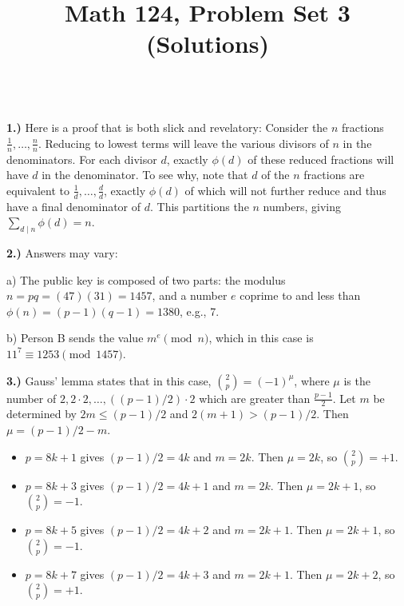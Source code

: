 \documentclass[10pt]{amsart}
\title{Math 124, Problem Set 3 (Solutions)}
\begin{document}
\maketitle

\\

{\bf 1.)} Here is a proof that is both slick and revelatory: Consider the $n$ fractions $\frac{1}{n}, \dotsc, \frac{n}{n}$. Reducing to lowest terms will leave the various divisors of $n$ in the denominators. For each divisor $d$, exactly $\phi(d)$ of these reduced fractions will have $d$ in the denominator. To see why, note that $d$ of the $n$ fractions are equivalent to $\frac{1}{d}, \dotsc, \frac{d}{d}$, exactly $\phi(d)$ of which will not further reduce and thus have a final denominator of $d$. This partitions the $n$ numbers, giving $\sum_{d \mid n} \phi(d) = n$.

\medskip

{\bf 2.)} Answers may vary:

\smallskip

a) The public key is composed of two parts: the modulus $n = pq = (47)(31) = 1457$, and a number $e$ coprime to and less than $\phi(n) = (p-1)(q-1) = 1380$, e.g., 7.

\smallskip

b) Person B sends the value $m^e \pmod{n}$, which in this case is $11^{7} \equiv 1253 \pmod{1457}$.

\medskip

{\bf 3.)} Gauss' lemma states that in this case, ${2 \choose p} = (-1)^{\mu}$, where $\mu$ is the number of $2, 2 \cdot 2, \dotsc, ((p-1)/2) \cdot 2$ which are greater than $\frac{p-1}{2}$. Let $m$ be determined by $2m \le (p-1)/2$ and $2(m+1) > (p-1)/2$. Then $\mu = (p-1)/2 - m$.

\begin{itemize}
\item $p = 8k+1$ gives $(p-1)/2 = 4k$ and $m = 2k$. Then $\mu = 2k$, so ${2 \choose p} = +1$.
\item $p = 8k+3$ gives $(p-1)/2 = 4k+1$ and $m = 2k$. Then $\mu = 2k+1$, so ${2 \choose p} = -1$.
\item $p = 8k+5$ gives $(p-1)/2 = 4k+2$ and $m = 2k+1$. Then $\mu = 2k+1$, so ${2 \choose p} = -1$.
\item $p = 8k+7$ gives $(p-1)/2 = 4k+3$ and $m = 2k+1$. Then $\mu = 2k+2$, so ${2 \choose p} = +1$.
\end{itemize}
\end{document}
